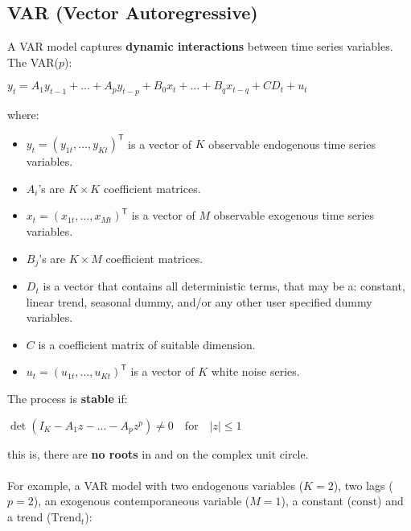 \documentclass[10pt, a4paper, landscape]{extarticle}
\newcommand{\tr}{\mathsf{T}}
\begin{document}
\begin{multicols}{2} %
\section*{VAR (Vector Autoregressive)}
	A VAR model captures \textbf{dynamic interactions} between time series variables. The VAR($p$):
	\begin{center}
		$y_t = A_1 y_{t-1} + \hdots + A_p y_{t-p} + B_0 x_t + \hdots + B_q x_{t-q} + CD_t + u_t$
	\end{center}
	where:
	\begin{itemize}[leftmargin=*]
		\item $y_t = (y_{1t}, ..., y_{Kt})^\tr$ is a vector of $K$ observable endogenous time series variables.
		\item $A_i$'s are $K \times K$ coefficient matrices.
		\item $x_t = (x_{1t}, ..., x_{Mt})^\tr$ is a vector of $M$ observable exogenous time series variables.
		\item $B_j$'s are $K \times M$ coefficient matrices.
		\item $D_t$ is a vector that contains all deterministic terms, that may be a: constant, linear trend, seasonal dummy, and/or any other user specified dummy variables.
		\item $C$ is a coefficient matrix of suitable dimension.
		\item $u_t = (u_{1t}, ..., u_{Kt})^\tr$ is a vector of $K$ white noise series.
	\end{itemize}
	The process is \textbf{stable} if:
	\begin{center}
		$\det(I_K - A_1 z - ... - A_p z^p) \neq 0 \quad \mathrm{for} \quad |z| \leq 1$
	\end{center}
	\quad this is, there are \textbf{no roots} in and on the complex unit circle. \\ \\
	For example, a VAR model with two endogenous variables ($K=2$), two lags ($p=2$), an exogenous contemporaneous variable ($M=1$), a constant ($\mathrm{const}$) and a trend ($\mathrm{Trend}_t$):
	\begin{center}
\end{center}
\end{multicols}
\end{document}
